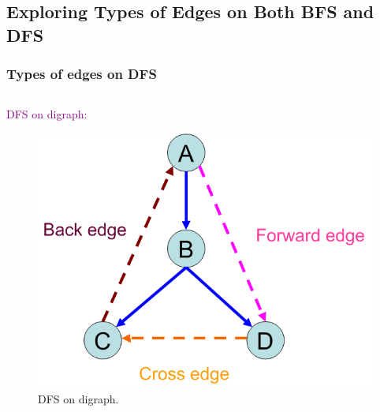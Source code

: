 \subsection{Exploring Types of Edges on Both BFS and DFS}

\begin{frame}
  \frametitle{Types of edges on DFS}

  \begin{columns}
    \begin{column}{0.50\textwidth}
      \textcolor{purple}{DFS on digraph:}
      \begin{figure}
        \includegraphics[scale=0.30]{figure/bfs_dfs/dfsdi}
        \caption{{\scriptsize DFS on digraph.}}
        \label{fig:dfsdi}
      \end{figure}
    \end{column}


\end{columns}
\end{frame}
